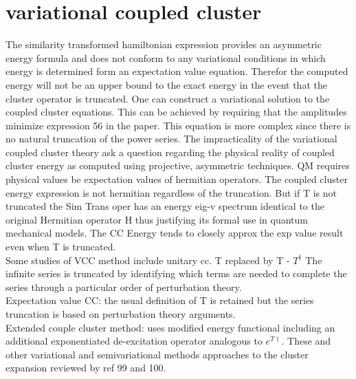 \documentclass[10pt, draft]{article}
\begin{document}
\section{variational coupled cluster}
The similarity transformed hamiltonian expression provides an asymmetric energy formula and does not conform to any variational conditions in which energy is determined form an expectation value equation.  Therefor the computed energy will not be an upper bound to the exact energy in the event that the cluster operator is truncated.  One can construct a variational solution to the coupled cluster equations.  This can be achieved by requiring that the amplitudes minimize expression 56 in the paper.  This equation is more complex since there is no natural truncation of the power series.  The impracticality of the variational coupled cluster theory ask a question regarding the physical reality of coupled cluster energy as computed using projective, asymmetric techniques. QM requires physical values be expectation values of hermitian operators.  The coupled cluster energy expression is not hermitian regardless of the truncation.  But if T is not truncated the Sim Trans oper has an energy eig-v spectrum identical to the original Hermitian operator H thus justifying its formal use in quantum mechanical models.  The CC Energy tends to closely approx the exp value result even when T is truncated. \\
Some studies of VCC method include unitary cc. T replaced by T - $T^\dagger$ The infinite series is truncated by identifying which terms are needed to complete the series through a particular order of perturbation theory. \\ Expectation value CC: the usual definition of T is retained but the series truncation is based on perturbation theory arguments.\\ Extended couple cluster method:  uses modified energy functional including an additional exponentiated de-excitation operator analogous to $e^{T\dagger}$.  These and other variational and semivariational methods approaches to the cluster expansion reviewed by ref 99 and 100.
\end{document}
